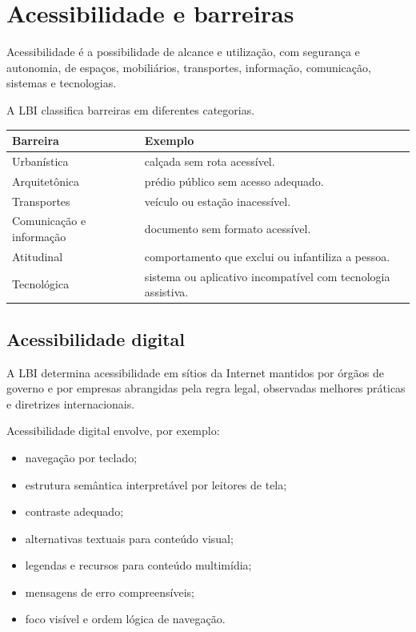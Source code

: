 \section{Acessibilidade e barreiras}

Acessibilidade é a possibilidade de alcance e utilização, com segurança e autonomia, de espaços, mobiliários, transportes, informação, comunicação, sistemas e tecnologias.

A LBI classifica barreiras em diferentes categorias.

\begin{table}[ht]
\centering
\small
\begin{tabularx}{\textwidth}{l X}
\toprule
Barreira & Exemplo \\
\midrule
Urbanística & calçada sem rota acessível. \\
Arquitetônica & prédio público sem acesso adequado. \\
Transportes & veículo ou estação inacessível. \\
Comunicação e informação & documento sem formato acessível. \\
Atitudinal & comportamento que exclui ou infantiliza a pessoa. \\
Tecnológica & sistema ou aplicativo incompatível com tecnologia assistiva. \\
\bottomrule
\end{tabularx}
\end{table}

\subsection{Acessibilidade digital}

A LBI determina acessibilidade em sítios da Internet mantidos por órgãos de governo e por empresas abrangidas pela regra legal, observadas melhores práticas e diretrizes internacionais.

Acessibilidade digital envolve, por exemplo:
\begin{itemize}
\item navegação por teclado;
\item estrutura semântica interpretável por leitores de tela;
\item contraste adequado;
\item alternativas textuais para conteúdo visual;
\item legendas e recursos para conteúdo multimídia;
\item mensagens de erro compreensíveis;
\item foco visível e ordem lógica de navegação.
\end{itemize}

